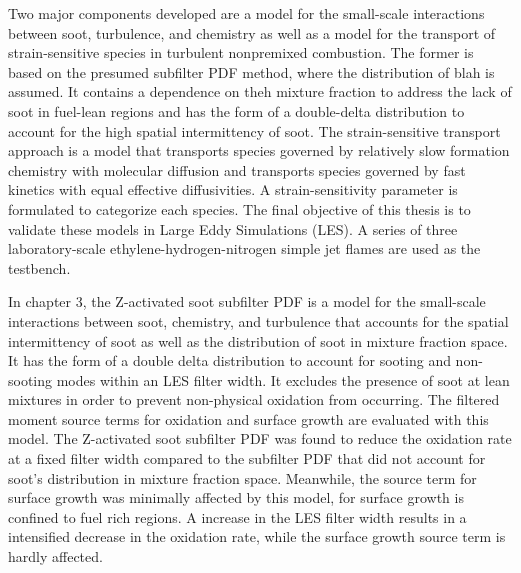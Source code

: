 Two major components developed are a model for the small-scale interactions between soot, turbulence, and chemistry as well as a model for the transport of strain-sensitive species in turbulent nonpremixed combustion. The former is based on the presumed subfilter PDF method, where the distribution of blah is assumed. It contains a dependence on theh mixture fraction to address the lack of soot in fuel-lean regions and has the form of a double-delta distribution to account for the high spatial intermittency of soot. The strain-sensitive transport approach is a model that transports species governed by relatively slow formation chemistry with molecular diffusion and transports species governed by fast kinetics with equal effective diffusivities. A strain-sensitivity parameter is formulated to categorize each species. The final objective of this thesis is to validate these models in Large Eddy Simulations (LES). A series of three laboratory-scale ethylene-hydrogen-nitrogen simple jet flames are used as the testbench.

In chapter 3, the Z-activated soot subfilter PDF is a model for the small-scale interactions between soot, chemistry, and turbulence that accounts for the spatial intermittency of soot as well as the distribution of soot in mixture fraction space. It has the form of a double delta distribution to account for sooting and non-sooting modes within an LES filter width. It excludes the presence of soot at lean mixtures in order to prevent non-physical oxidation from occurring. The filtered moment source terms for oxidation and surface growth are evaluated with this model. The Z-activated soot subfilter PDF was found to reduce the oxidation rate at a fixed filter width compared to the subfilter PDF that did not account for soot's distribution in mixture fraction space. Meanwhile, the source term for surface growth was minimally affected by this model, for surface growth is confined to fuel rich regions. A increase in the LES filter width results in a intensified decrease in the oxidation rate, while the surface growth source term is hardly affected.

